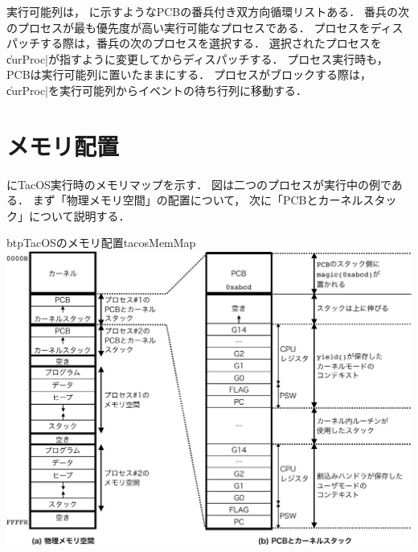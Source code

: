 実行可能列は，
に示すようなPCBの番兵付き双方向循環リストある．
番兵の次のプロセスが最も優先度が高い実行可能なプロセスである．
プロセスをディスパッチする際は，番兵の次のプロセスを選択する．
選択されたプロセスを\|curProc|が指すように変更してからディスパッチする．
プロセス実行時も，PCBは実行可能列に置いたままにする．
プロセスがブロックする際は，
\|curProc|を実行可能列からイベントの待ち行列に移動する．

\section{メモリ配置}
にTacOS実行時のメモリマップを示す．
図は二つのプロセスが実行中の例である．
まず「物理メモリ空間」の配置について，
次に「PCBとカーネルスタック」について説明する．

\begin{myfig}{btp}{TacOSのメモリ配置}{tacosMemMap}
  \includegraphics[scale=0.6]{Fig/tacosMemMap-crop.pdf}
\end{myfig}

